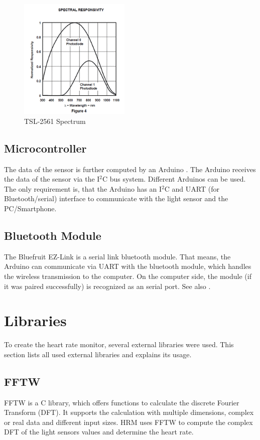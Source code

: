 \documentclass[notitlepage]{scrreprt}
\begin{document}
\begin{figure}[H]
	\centering
	\includegraphics[width=200px]{images/light_tsl2561spectrum.png}
	\caption{TSL-2561 Spectrum}
	\label{fig:tsl-2561-spectrum}
\end{figure}

\subsection{Microcontroller}
The data of the sensor is further computed by an Arduino \cite{bib:arduino-board}. The Arduino receives the data of the sensor via the I$^{2}$C bus system. Different Arduinos can be used. The only requirement is, that the Arduino has an I$^{2}$C and UART (for Bluetooth/serial) interface to communicate with the light sensor and the PC/Smartphone.

\subsection{Bluetooth Module}
The Bluefruit EZ-Link is a serial link bluetooth module. That means, the Arduino can communicate via UART with the bluetooth module, which handles the wireless transmission to the computer. On the computer side, the module (if it was paired successfully) is recognized as an serial port. See also \cite{bib:bluetooth-adapter}.

\newpage

\section{Libraries}
To create the heart rate monitor, several external libraries were used. This section lists all used external libraries and explains its usage.

\subsection{FFTW}
FFTW is a C library, which offers functions to calculate the discrete Fourier Transform (DFT). It supports the calculation with multiple dimensions, complex or real data and different input sizes. HRM uses FFTW to compute the complex DFT of the light sensors values and determine the heart rate.
\end{document}
